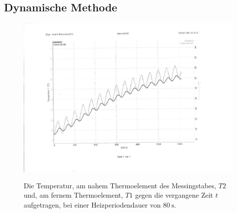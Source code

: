 \subsection{Dynamische Methode}
\begin{figure}
	\centering
	\caption{Die Temperatur, am nahem Thermoelement des Messingstabes, $T2$ und, am fernem Thermoelement, $T1$ gegen die vergangene Zeit $t$ aufgetragen, bei einer Heizperiodendauer von $\SI{80}{\second}$.}
	\includegraphics[width=\linewidth-70pt,height=\textheight-70pt,keepaspectratio]{content/Bilder/T1T2-rotated.pdf}
	\label{fig:Graph5}
\end{figure}
\begin{table}
	\centering
	\caption{Die aus dem Graphen in Abbildung \ref{fig:Graph5} entnommenen Werte für die Phasendifferenz $\Delta t$, die Amplitude am nahem Thermoelement des breitem Messingstabes $A_\text{nah}$ und am fernem Thermoelement $A_\text{fern}$.}
	
\end{table}

